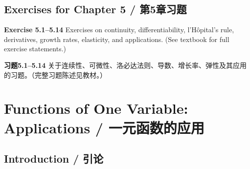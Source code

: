 \section{Exercises for Chapter 5 / 第5章习题}

\begin{original}
\textbf{Exercise 5.1--5.14} Exercises on continuity, differentiability, l'H\^{o}pital's rule, derivatives, growth rates, elasticity, and applications. (See textbook for full exercise statements.)
\end{original}
\begin{translation}
\textbf{习题5.1--5.14} 关于连续性、可微性、洛必达法则、导数、增长率、弹性及其应用的习题。（完整习题陈述见教材。）
\end{translation}


\chapter{Functions of One Variable: Applications / 一元函数的应用}

\section{Introduction / 引论}

